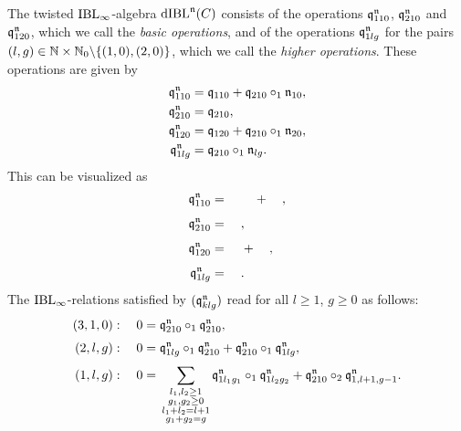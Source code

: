 \documentclass[\MainFolder/Text.tex]{subfiles}
\begin{document}
\begin{Proposition}
The twisted $\mathrm{IBL}_\infty$-algebra $\mathrm{dIBL}^{\mathfrak{n}}(C)$ consists of the operations $\mathfrak{q}_{110}^{\mathfrak{n}}$, $\mathfrak{q}_{210}^{\mathfrak{n}}$ and~$\mathfrak{q}_{120}^{\mathfrak{n}}$, which we call the \emph{basic operations}, and of the operations $\mathfrak{q}_{1lg}^{\mathfrak{n}}$ for the pairs $(l,g)\in \mathbb{N} \times \mathbb{N}_0 \backslash \{(1,0),(2,0)\}$, which we call the \emph{higher operations}. These operations are given by 
\[ \begin{aligned}
\mathfrak{q}_{110}^{\mathfrak{n}} &= \mathfrak{q}_{110} + \mathfrak{q}_{210}\circ_1 \mathfrak{n}_{10},\\
\mathfrak{q}_{210}^{\mathfrak{n}} &= \mathfrak{q}_{210}, \\
\mathfrak{q}_{120}^{\mathfrak{n}} & = \mathfrak{q}_{120} + \mathfrak{q}_{210}\circ_1 \mathfrak{n}_{20},\\
\mathfrak{q}_{1lg}^{\mathfrak{n}} & = \mathfrak{q}_{210}\circ_1 \mathfrak{n}_{lg}.
\end{aligned}\]
This can be visualized as
{ \begingroup \allowdisplaybreaks
\def\dist{0.25} %
  \def\rad{0.5} %
  \def\ecc{0.1} %
  \def\hght{1} %
  \def\dif{1.5} %
  \def\radO{\rad} %
  \def\eccO{\ecc} %
  \def\hghtO{2*\hght+\dist} %
  \def\difO{\dif} %
  \def\gencanc{0.05} %
  \def\genecc{20} %
  \def\genrad{0.45} %
\begin{align*}
\OPQ_{110}^\PMC & =\quad\vcenterline{}\quad +\quad \vcenterline{}, \\[1ex] 
\OPQ_{210}^\PMC &=\quad \vcenterline{}, \\[1ex] 
\OPQ_{120}^\PMC &=\quad \vcenterline{}+\quad\vcenterline{}, \\[1ex]
\OPQ^{\PMC}_{1lg} & =\quad \vcenterline{}.
\end{align*}
\endgroup}
The $\mathrm{IBL}_\infty$-relations satisfied by $(\mathfrak{q}_{klg}^{\mathfrak{n}})$ read for all $l\ge 1$, $g\ge 0$ as follows:
\begin{equation}\label{Eq:IBLInftydIBL}
\begin{aligned}
(3,1,0):\quad 0& = \OPQ_{210}^\PMC \circ_1 \OPQ_{210}^\PMC, \\[\jot]
(2,l,g):\quad 0&=\OPQ^\PMC_{1lg}\circ_1 \OPQ^\PMC_{210} + \OPQ^\PMC_{210}\circ_1\OPQ^\PMC_{1lg}, \\[\jot]
(1,l,g):\quad 0&= \begin{multlined}[t] \sum_{\substack{l_1, l_2 \ge 1 \\ g_1, g_2 \ge 0 \\ l_1 + l_2 = l+1 \\ g_1 + g_2 = g}} \OPQ^\PMC_{1l_1 g_1}\circ_1 \OPQ^\PMC_{1 l_2 g_2}+\OPQ^\PMC_{210} \circ_2 \OPQ^\PMC_{1, l+1, g-1}.\end{multlined}

\end{aligned}
\end{equation}
\end{Proposition}
\end{document}
